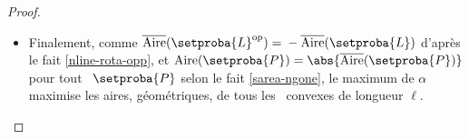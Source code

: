 \begin{proof}
\begin{itemize}
        \item Finalement, comme
        $\sarea{\setproba{L}^{\mathrm{op}}} = {} - \sarea{\setproba{L}}$ d'après le fait \ref{nline-rota-opp}, et 
        $\area{\setproba{P}} = \abs{\sarea{\setproba{P}}}$ pour tout \ngone\ $\setproba{P}$ selon le fait \ref{sarea-ngone},
        le maximum de $\alpha$ maximise les aires, géométriques, de tous les \ngones\ convexes de longueur $\ell$.
    \end{itemize}
	
	\null\vspace{-6ex}
\end{proof}
